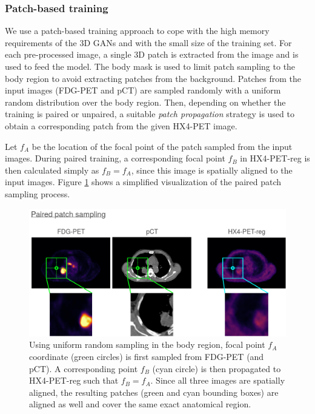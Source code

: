 \subsubsection{Patch-based training}
We use a patch-based training approach to cope with the high memory requirements of the 3D GANs and with the small size of the training set. For each pre-processed image, a single 3D patch is extracted from the image and is used to feed the model. The body mask is used to limit patch sampling to the body region to avoid extracting patches from the background. Patches from the input images (FDG-PET and pCT) are sampled randomly with a uniform random distribution over the body region. Then, depending on whether the training is paired or unpaired, a suitable \textit{patch propagation} strategy is used to obtain a corresponding patch from the given HX4-PET image.

Let $f_A$ be the location of the focal point of the patch sampled from the input images. During paired training, a corresponding focal point $f_B$ in HX4-PET-reg is then calculated simply as $f_B = f_A$, since this image is spatially aligned to the input images. Figure \ref{fig:paired_patch_sampling} shows a simplified visualization of the paired patch sampling process.

\begin{figure}[h!]
    \centering
    \includegraphics[width=\linewidth]{figures/Data/patch_sampling/paired_patch_sampling.png}
    \caption{Using uniform random sampling in the body region, focal point $f_A$ coordinate (green circles) is first sampled from FDG-PET (and pCT). A corresponding point $f_B$ (cyan circle) is then propagated to HX4-PET-reg such that $f_B = f_A$. Since all three images are spatially aligned, the resulting patches (green and cyan bounding boxes) are aligned as well and cover the same exact anatomical region.}
    \label{fig:paired_patch_sampling}
\end{figure}

